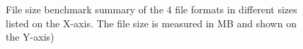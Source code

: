  \begin{figure}[H]%
    \centering
    \qquad
    \caption{File size benchmark summary of the 4 file formats in different sizes listed on the X-axis. The file size is measured in MB and shown on the Y-axis)}%
    \label{fig:size_summary}%
\end{figure}